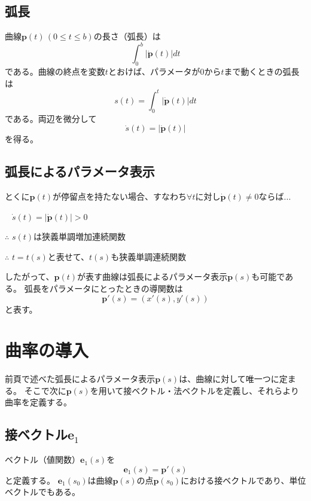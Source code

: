 \documentclass[a4j,disablejfam,dvipdfmx,papersize,slide,uplatex,21pt]{jsarticle}
\begin{document}
\newpage
\subsection*{弧長}
曲線$\bm{p}(t)\,(0 \le t \le b)$の長さ（弧長）は
\begin{equation}
    \int_0^b |\dot{\bm{p}}(t)| dt
\end{equation}
である。曲線の終点を変数$t$とおけば、パラメータが$0$から$t$まで動くときの弧長は
\begin{equation}
    s(t) = \int_0^t |\dot{\bm{p}}(t)| dt
\end{equation}
である。両辺を微分して
\begin{equation}
    \dot{s}(t) = |\dot{\bm{p}}(t)|
\end{equation}
を得る。

\newpage
\subsection*{弧長によるパラメータ表示}
とくに$\bm{p}(t)$が停留点を持たない場合、すなわち$\forall t$に対し$\dot{\bm{p}}(t) \neq 0$ならば...

$\phantom{\therefore}$ $\dot{s}(t) = |\dot{\bm{p}}(t)| > 0$

$\therefore$ $s(t)$は狭義単調増加連続関数

$\therefore$ $t = t(s)$と表せて、$t(s)$も狭義単調連続関数

\vspace{1em}

したがって、$\bm{p}(t)$が表す曲線は弧長によるパラメータ表示$\bm{p}(s)$も可能である。
弧長をパラメータにとったときの導関数は
\begin{equation}
    \bm{p}'(s) = (x'(s), y'(s))
\end{equation}
と表す。



\section{曲率の導入}
前頁で述べた弧長によるパラメータ表示$\bm{p}(s)$は、曲線に対して唯一つに定まる。
そこで次に$\bm{p}(s)$を用いて接ベクトル・法ベクトルを定義し、それらより曲率を定義する。

\newpage
\subsection*{接ベクトル$\bm{e}_1$}
ベクトル（値関数）$\bm{e}_1(s)$を
\begin{equation}
    \bm{e}_1(s) = \bm{p}'(s)
\end{equation}
と定義する。
$\bm{e}_1(s_0)$は曲線$\bm{p}(s)$の点$\bm{p}(s_0)$における接ベクトルであり、単位ベクトルでもある。
\end{document}
